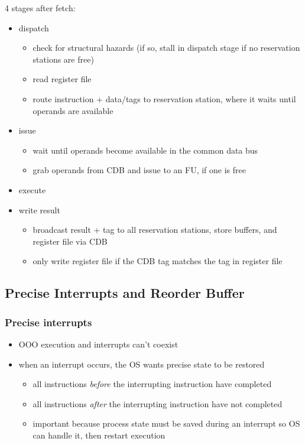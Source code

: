 \documentclass[12pt]{extarticle}
\begin{document}
	4 stages after fetch:

	\begin{itemize}
		\item dispatch
		\begin{itemize}
			\item check for structural hazards (if so, stall in dispatch stage if no reservation stations are free)
			\item read register file
			\item route instruction + data/tags to reservation station, where it waits until operands are available
		\end{itemize}

		\item issue
		\begin{itemize}
			\item wait until operands become available in the common data bus
			\item grab operands from CDB and issue to an FU, if one is free
		\end{itemize}

		\item execute
		\item write result
		\begin{itemize}
			\item broadcast result + tag to all reservation stations, store buffers, and register file via CDB
			\item only write register file if the CDB tag matches the tag in register file
		\end{itemize}
	\end{itemize}

	\subsection{Precise Interrupts and Reorder Buffer}

	\subsubsection{Precise interrupts}

	\begin{itemize}
		\item OOO execution and interrupts can't coexist
		\item when an interrupt occurs, the OS wants precise state to be restored
		\begin{itemize}
			\item all instructions \textit{before} the interrupting instruction have completed
			\item all instructions \textit{after} the interrupting instruction have not completed
			\item important because process state must be saved during an interrupt so OS can handle it, then restart execution
		\end{itemize}
	\end{itemize}
\end{document}
